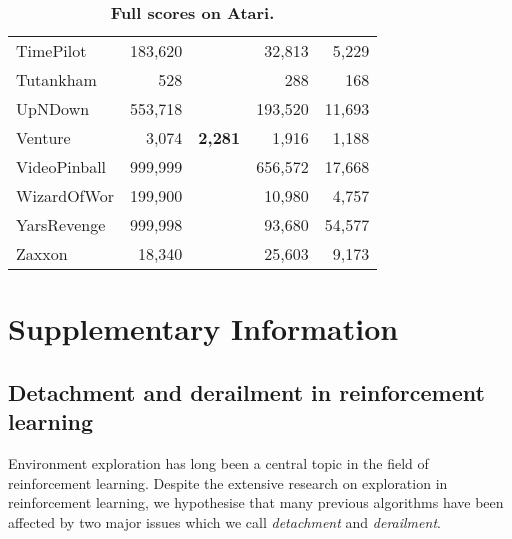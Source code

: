\documentclass{nature}
\renewcommand*{\cite}[1]{\supercite{#1}}
\begin{document}
\begin{table}[ht!]
\begin{tabular}{l|r|rrr}
TimePilot        & 183,620 &             &  32,813 &     5,229 \\
Tutankham        &     528 &             &     288 &       168 \\
UpNDown          & 553,718 &             & 193,520 &    11,693 \\
Venture          &   3,074 &     \bf{2,281} &   1,916 &     1,188 \\
VideoPinball     & 999,999 &             & 656,572 &    17,668 \\
WizardOfWor      & 199,900 &             &  10,980 &     4,757 \\
YarsRevenge      & 999,998 &             &  93,680 &    54,577 \\
Zaxxon           &  18,340 &             &  25,603 &     9,173 \\
    \end{tabular}
    \caption{\textbf{Full scores on Atari.}}
    \label{etab:atari_full_scores}
\end{table}

\FloatBarrier

\endrefsegment
\newrefsegment

\section*{Supplementary Information}

\renewcommand{\figurename}{Supplementary Information Figure}
\renewcommand{\tablename}{Supplementary Information Table}
\setcounter{figure}{0}
\setcounter{table}{0}


\subsection{Detachment and derailment in reinforcement learning}

Environment exploration has long been a central topic in the field of reinforcement learning\cite{bellemare2016unifying, guo2019efficient, burda:rnd2018, Choi2018ContingencyAwareEI, tang2017exploration}. 
Despite the extensive research on exploration in reinforcement learning, we hypothesise that many previous algorithms have been affected by two major issues which we call \emph{detachment} and \emph{derailment}.
\end{document}
